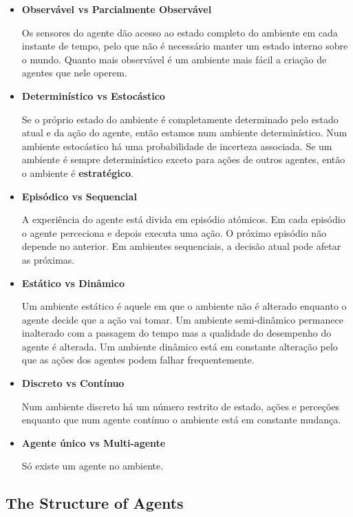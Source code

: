 \documentclass[12pt]{article}
\begin{document}
\begin{itemize}
    \item \textbf{Observável vs Parcialmente Observável}

    Os sensores do agente dão acesso ao estado completo do ambiente em cada instante de tempo, pelo que não é necessário manter um estado interno sobre o mundo. Quanto mais observável é um ambiente mais fácil a criação de agentes que nele operem.

    \item \textbf{Determinístico vs Estocástico}

    Se o próprio estado do ambiente é completamente determinado pelo estado atual e da ação do agente, então estamos num ambiente determinístico. Num ambiente estocástico há uma probabilidade de incerteza associada. Se um ambiente é sempre determinístico exceto para ações de outros agentes, então o ambiente é \textbf{estratégico}.

    \item \textbf{Episódico vs Sequencial}
    
    A experiência do agente está divida em episódio atómicos. Em cada episódio o agente perceciona e depois executa uma ação. O próximo episódio não depende no anterior. Em ambientes sequenciais, a decisão atual pode afetar as próximas.
    
    \item \textbf{Estático vs Dinâmico}
    
    Um ambiente estático é aquele em que o ambiente não é alterado enquanto o agente decide que a ação vai tomar. Um ambiente semi-dinâmico permanece inalterado com a passagem do tempo mas a qualidade do desempenho do agente é alterada. Um ambiente dinâmico está em constante alteração pelo que as ações dos agentes podem falhar frequentemente.
    
    \item \textbf{Discreto vs Contínuo}

    Num ambiente discreto há um número restrito de estado, ações e perceções enquanto que num agente contínuo o ambiente está em constante mudança.

    \item \textbf{Agente único vs Multi-agente}
    
    Só existe um agente no ambiente.
\end{itemize}

\subsection{The Structure of Agents}
\end{document}
